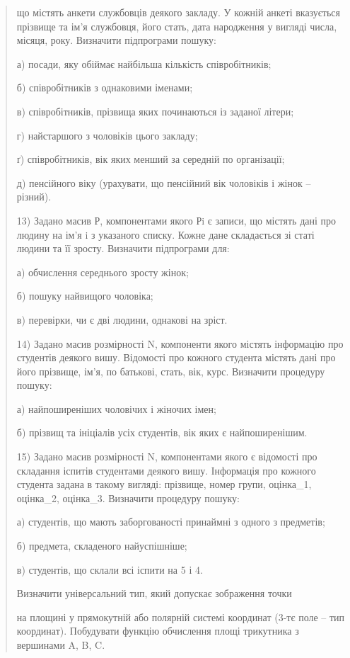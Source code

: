 \documentclass[]{article}
\begin{document}
\begin{quote}
що містять анкети службовців деякого закладу. У кожній анкеті вказується
прізвище та ім'я службовця, його стать, дата народження у вигляді числа,
місяця, року. Визначити підпрограми пошуку:

а) посади, яку обіймає найбільша кількість співробітників;

б) співробітників з однаковими іменами;

в) співробітників, прізвища яких починаються із заданої літери;

г) найстаршого з чоловіків цього закладу;

ґ) співробітників, вік яких менший за середній по організації;

д) пенсійного віку (урахувати, що пенсійний вік чоловіків і жінок --
різний).

13) Задано масив Р, компонентами якого Рi є записи, що містять дані про
людину на ім'я i з указаного списку. Кожне дане складається зі статі
людини та її зросту. Визначити підпрограми для:

а) обчислення середнього зросту жінок;

б) пошуку найвищого чоловіка;

в) перевірки, чи є дві людини, однакові на зріст.

14) Задано масив розмірності N, компоненти якого містять інформацію про
студентів деякого вишу. Відомості про кожного студента містять дані про
його прізвище, ім'я, по батькові, стать, вік, курс. Визначити процедуру
пошуку:

а) найпоширеніших чоловічих і жіночих імен;

б) прізвищ та ініціалів усіх студентів, вік яких є найпоширенішим.

15) Задано масив розмірності N, компонентами якого є відомості про
складання іспитів студентами деякого вишу. Інформація про кожного
студента задана в такому вигляді: прізвище, номер групи, оцінка\_1,
оцінка\_2, оцінка\_3. Визначити процедуру пошуку:

а) студентів, що мають заборгованості принаймні з одного з предметів;

б) предмета, складеного найуспішніше;

в) студентів, що склали всі іспити на 5 і 4.

Визначити універсальний тип, який допускає зображення точки

на площині у прямокутній або полярній системі координат (3-тє поле --
тип координат). Побудувати функцію обчислення площі трикутника з
вершинами A, B, C.


\end{quote}
\end{document}
